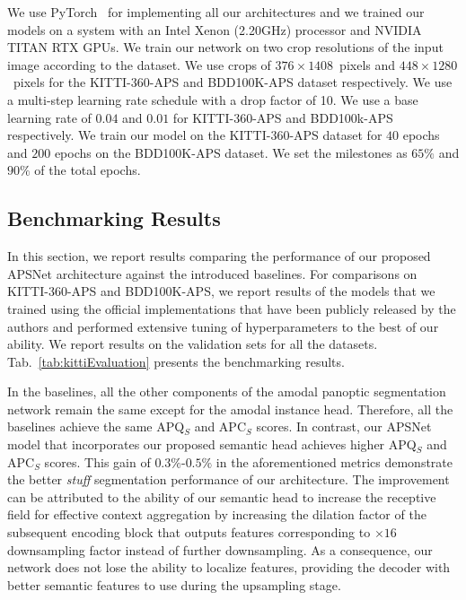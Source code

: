 \documentclass[10pt,twocolumn,letterpaper]{article}
\newcommand{\tabref}[1]{Tab.~\ref{#1}}
\begin{document}
We use PyTorch~\cite{paszke2019pytorch} for implementing all our architectures and we trained our models on a system with an Intel Xenon (2.20GHz) processor and NVIDIA TITAN RTX GPUs. We train our network on two crop resolutions of the input image according to the dataset. We use crops of $376\times1408$~pixels and $448\times1280$~pixels for the KITTI-360-APS and BDD100K-APS dataset respectively. We use a multi-step learning rate schedule with a drop factor of 10. We use a base learning rate of $0.04$ and $0.01$ for KITTI-360-APS and BDD100k-APS respectively. We train our model on the KITTI-360-APS dataset for $40$ epochs and $200$ epochs on the BDD100K-APS dataset. We set the milestones as $65\%$ and $90\%$ of the total epochs.

\subsection{Benchmarking Results}
\label{sec:benchmark}

In this section, we report results comparing the performance of our proposed \mbox{APSNet} architecture against the introduced baselines. For comparisons on KITTI-360-APS and BDD100K-APS, we report results of the models that we trained using the official implementations that have been publicly released by the authors and performed extensive tuning of hyperparameters to the best of our ability. We report results on the validation sets for all the datasets. \tabref{tab:kittiEvaluation} presents the benchmarking results.

In the baselines, all the other components of the amodal panoptic segmentation network remain the same except for the amodal instance head. Therefore, all the baselines achieve the same APQ$_S$ and APC$_S$ scores. In contrast, our \mbox{APSNet} model that incorporates our proposed semantic head achieves higher APQ$_S$ and APC$_S$ scores. This gain of $0.3\%\text{-}0.5\%$ in the aforementioned metrics demonstrate the better \textit{stuff} segmentation performance of our architecture. The improvement can be attributed to the ability of our semantic head to increase the receptive field for effective context aggregation by increasing the dilation factor of the subsequent encoding block that outputs features corresponding to $\times16$ downsampling factor instead of further downsampling. As a consequence, our network does not lose the ability to localize features, providing the decoder with better semantic features to use during the upsampling stage.
\end{document}
